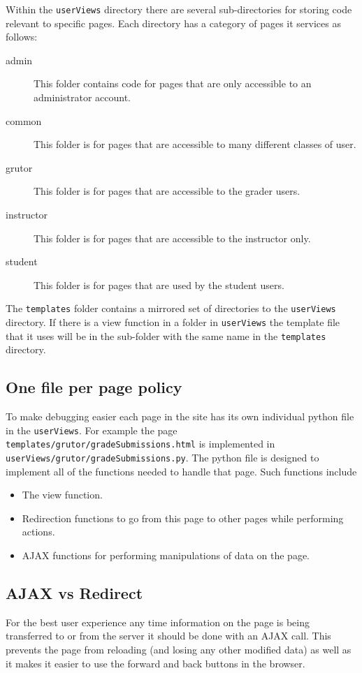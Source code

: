 \documentclass[11pt]{report}
\begin{document}
Within the \texttt{userViews} directory there are several sub-directories for storing code 
relevant to specific pages. Each directory has a category of pages it services as follows:

\begin{description}
\item[admin] This folder contains code for pages that are only accessible to an administrator 
account.
\item[common] This folder is for pages that are accessible to many different classes of user.
\item[grutor] This folder is for pages that are accessible to the grader users.
\item[instructor] This folder is for pages that are accessible to the instructor only.
\item[student] This folder is for pages that are used by the student users.
\end{description}

The \texttt{templates} folder contains a mirrored set of directories to the \texttt{userViews}
directory. If there is a view function in a folder in \texttt{userViews} the template file that 
it uses will be in the sub-folder with the same name in the \texttt{templates} directory.

\subsection{One file per page policy}
To make debugging easier each page in the site has its own individual python file in the 
\texttt{userViews}. For example the page \texttt{templates/grutor/gradeSubmissions.html} is
implemented in \texttt{userViews/grutor/gradeSubmissions.py}. The python file is designed to 
implement all of the functions needed to handle that page. Such functions include

\begin{itemize}
\item The view function.
\item Redirection functions to go from this page to other pages while performing actions.
\item AJAX functions for performing manipulations of data on the page.
\end{itemize}

\subsection{AJAX vs Redirect}
For the best user experience any time information on the page is being transferred to or 
from the server it should be done with an AJAX call. This prevents the page from reloading
(and losing any other modified data) as well as it makes it easier to use the forward and
back buttons in the browser.
\end{document}
